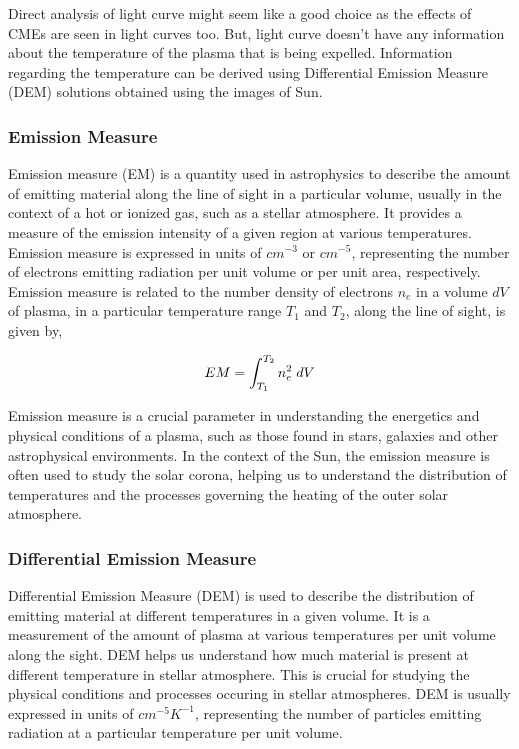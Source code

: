 \message{ !name(main.tex)}\documentclass[12pt]{article}
\begin{document}
Direct analysis of light curve might seem like a good choice as the effects of CMEs are seen in light curves too. But, light curve doesn't have any information about the temperature of the plasma that is being expelled. Information regarding the temperature can be derived using Differential Emission Measure (DEM) solutions obtained using the images of Sun.

\subsubsection{Emission Measure}

Emission measure (EM) is a quantity used in astrophysics to describe the amount of emitting material along the line of sight in a particular volume, usually in the context of a hot or ionized gas, such as a stellar atmosphere. It provides a measure of the emission intensity of a given region at various temperatures. Emission measure is expressed in units of $cm^{-3}$ or $cm^{-5}$, representing the number of electrons  emitting radiation per unit volume or per unit area, respectively.\\

Emission measure is related to the number density of electrons $n_e$ in a volume $dV$ of plasma, in a particular temperature range $T_1$ and $T_2$, along the line of sight, is given by,

\vspace{-0.75cm}
\begin{center}
    \begin{equation*}
        EM = \int_{T_1}^{T_2} n_e^2 \hspace{0.1cm} dV
    \end{equation*}
\end{center}

Emission measure is a crucial parameter in understanding the energetics and physical conditions of a plasma, such as those found in stars, galaxies and other astrophysical environments. In the context of the Sun, the emission measure is often used to study the solar corona, helping us to understand the distribution of temperatures and the processes governing the heating of the outer solar atmosphere.

\subsubsection{Differential Emission Measure}

Differential Emission Measure (DEM) is used to describe the distribution of emitting material at different temperatures in a given volume. It is a measurement of the amount of plasma at various temperatures per unit volume along the sight. DEM helps us understand how much material is present at different temperature in stellar atmosphere. This is crucial for studying the physical conditions and processes occuring in stellar atmospheres. DEM is usually expressed in units of $cm^{-5}K^{-1}$, representing the number of particles emitting radiation at a particular temperature per unit volume.
\end{document}
